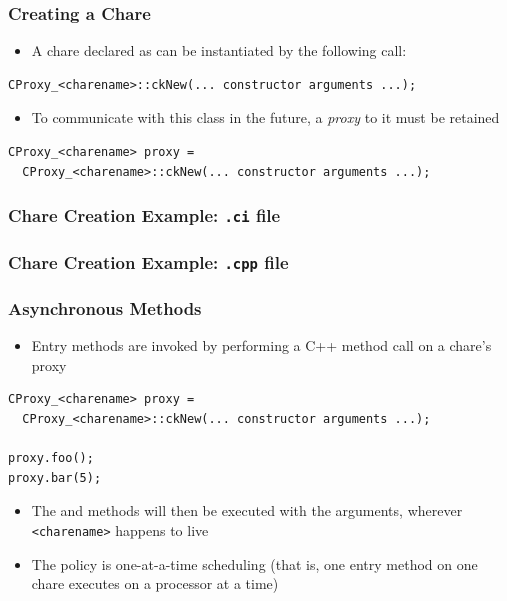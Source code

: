 \begin{frame}[fragile]
  \frametitle{Creating a Chare}
  \begin{itemize}
    \item A chare declared as  can be
      instantiated by the following call:
  \end{itemize}
\begin{lstlisting}
CProxy_<charename>::ckNew(... constructor arguments ...);
\end{lstlisting}
  \begin{itemize}
  \item To communicate with this class in the future, a \textit{proxy} to it
    must be retained
  \end{itemize}
\begin{lstlisting}
CProxy_<charename> proxy = 
  CProxy_<charename>::ckNew(... constructor arguments ...);
\end{lstlisting}
\end{frame}

\begin{frame}[fragile]
  \frametitle{Chare Creation Example: \texttt{.ci} file}
  
\end{frame}

\begin{frame}[fragile]
  \frametitle{Chare Creation Example: \texttt{.cpp} file}
  
\end{frame}

\begin{frame}[fragile]
  \frametitle{Asynchronous Methods}
  \begin{itemize}
  \item Entry methods are invoked by performing a C++ method call on a chare's
    proxy
  \end{itemize}
  \begin{lstlisting}
CProxy_<charename> proxy =
  CProxy_<charename>::ckNew(... constructor arguments ...);

proxy.foo();
proxy.bar(5);
\end{lstlisting}
\begin{itemize}
\item The  and  methods will then be executed with the
  arguments, wherever \texttt{<charename>} happens to live
\item The policy is one-at-a-time scheduling (that is, one entry method on one
  chare executes on a processor at a time)
\end{itemize}
\end{frame}

